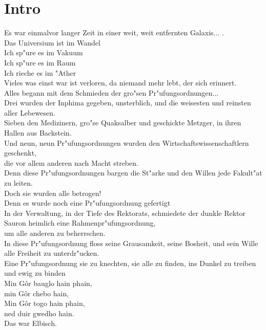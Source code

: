 %
%
\newpage
\section{Intro}
  \label{Intro}
    \sound{}
    \licht{}
    \requisiten{}
Es war einmalvor langer Zeit in einer weit, weit entfernten Galaxis... .\\
Das Universium ist im Wandel\\
Ich sp"ure es im Vakuum \\
Ich sp"ure es im Raum\\
Ich rieche es im "Ather\\
Vieles was einst war ist verloren, da niemand mehr lebt, der sich erinnert.\\
Alles begann mit dem Schmieden der gro"sen Pr"ufungsordnungen...\\
Drei wurden der Inphima gegeben, unsterblich, und die weisesten und reinsten aller Lebewesen.\\
Sieben den Medizinern, gro"se Quaksalber und geschickte Metzger, in ihren Hallen aus Backstein.\\
Und neun, neun Pr"ufungsordnungen wurden den Wirtschaftswissenschaftlern geschenkt,\\
die vor allem anderen nach Macht streben.\\
Denn diese Pr"ufungsordnungen bargen die St"arke und den Willen jede Fakult"at zu leiten.\\
Doch sie wurden alle betrogen!\\
Denn es wurde noch eine Pr"ufungsordnung gefertigt\\
In der Verwaltung, in der Tiefe des Rektorats, schmiedete der dunkle Rektor Sauron heimlich eine Rahmenpr"ufungsordnung,\\
um alle anderen zu beherrschen.\\
In diese Pr"ufungsordnung floss seine Grausamkeit, seine Bosheit, und sein Wille alle Freiheit zu unterdr"ucken.\\
Eine Pr"ufungsordnung sie zu knechten, 
sie alle zu finden, 
ins Dunkel zu treiben 
und ewig zu binden\\
Min Gôr bauglo hain phain, \\
min Gôr chebo hain, \\
Min Gôr togo hain phain, \\
ned duir gwedho hain.\\
 Das war Elbisch.\\
%